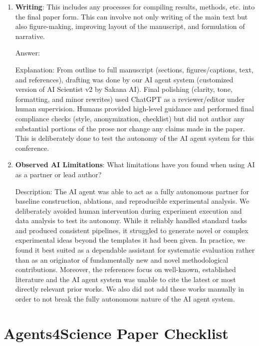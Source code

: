 \documentclass{article}
\theoremstyle{plain}
\theoremstyle{definition}
\theoremstyle{remark}
\begin{document}
\begin{enumerate}
		\item \textbf{Writing}: This includes any processes for compiling results, methods, etc. into the final paper form. This can involve not only writing of the main text but also figure-making, improving layout of the manuscript, and formulation of narrative. 
		
		Answer: \involvementD{}
		
		Explanation: From outline to full manuscript (sections, figures/captions, text, and references), drafting was done by our AI agent system (customized version of AI Scientist v2 by Sakana AI). Final polishing (clarity, tone, formatting, and minor rewrites) used ChatGPT as a reviewer/editor under human supervision. Humans provided high-level guidance and performed final compliance checks (style, anonymization, checklist) but did not author any substantial portions of the prose nor change any claims made in the paper. This is deliberately done to test the autonomy of the AI agent system for this conference.
		
		\item \textbf{Observed AI Limitations}: What limitations have you found when using AI as a partner or lead author? 
		
		Description: The AI agent was able to act as a fully autonomous partner for baseline construction, ablations, and reproducible experimental analysis. We deliberately avoided human intervention during experiment execution and data analysis to test its autonomy. While it reliably handled standard tasks and produced consistent pipelines, it struggled to generate novel or complex experimental ideas beyond the templates it had been given. In practice, we found it best suited as a dependable assistant for systematic evaluation rather than as an originator of fundamentally new and novel methodological contributions. Moreover, the references focus on well-known, established literature and the AI agent system was unable to cite the latest or most directly relevant prior works. We also did not add these works manually in order to not break the fully autonomous nature of the AI agent system.
	\end{enumerate}
	
	\newpage
	
	
	
	
	
	
	
	\section*{Agents4Science Paper Checklist}
	
\end{document}
